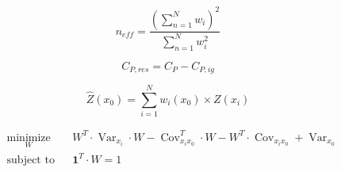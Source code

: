 \documentclass{report}
\begin{document}
\[
 n_{eff} = \frac{\left(\sum\limits_{n=1}^N w_i\right)^2}{\sum\limits_{n=1}^N w_i^2}
\]

\[
C_{P,res} = C_P - C_{P,ig}
\]


\begin{equation} 
\hat{Z}\left(x_0\right) = \sum\limits_{i=1}^N w_i\left(x_0\right) \times Z\left(x_i\right) 
\end{equation}


\begin{align}
                	&\underset{W}{\text{minimize}}& & W^T \cdot \operatorname{Var}_{x_i} \cdot W - \operatorname{Cov}_{x_ix_0}^T \cdot W - W^T \cdot \operatorname{Cov}_{x_ix_0} + \operatorname{Var}_{x_0} \\
                	&\text{subject to}
                	& &\mathbf{1}^T \cdot W = 1
                	\end{align}
\end{document}
